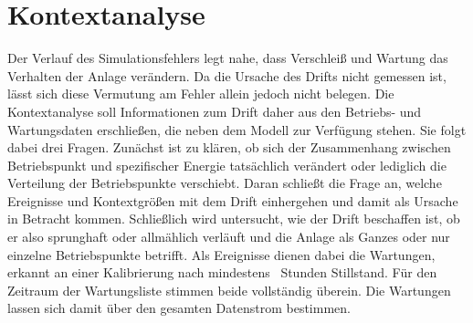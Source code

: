 \section{Kontextanalyse} \label{sec:mill_kontext}
%

%
Der Verlauf des Simulationsfehlers legt nahe, dass Verschleiß und Wartung das Verhalten der Anlage verändern. Da die Ursache des Drifts nicht gemessen ist, lässt sich diese Vermutung am Fehler allein jedoch nicht belegen. Die Kontextanalyse soll Informationen zum Drift daher aus den Betriebs- und Wartungsdaten erschließen, die neben dem Modell zur Verfügung stehen. Sie folgt dabei drei Fragen. Zunächst ist zu klären, ob sich der Zusammenhang zwischen Betriebspunkt und spezifischer Energie tatsächlich verändert oder lediglich die Verteilung der Betriebspunkte verschiebt. Daran schließt die Frage an, welche Ereignisse und Kontextgrößen mit dem Drift einhergehen und damit als Ursache in Betracht kommen. Schließlich wird untersucht, wie der Drift beschaffen ist, ob er also sprunghaft oder allmählich verläuft und die Anlage als Ganzes oder nur einzelne Betriebspunkte betrifft. Als Ereignisse dienen dabei die Wartungen, erkannt an einer Kalibrierung nach mindestens \millCtxLongStopH~Stunden Stillstand. Für den Zeitraum der Wartungsliste stimmen beide vollständig überein. Die Wartungen lassen sich damit über den gesamten Datenstrom bestimmen. \par
%
%
